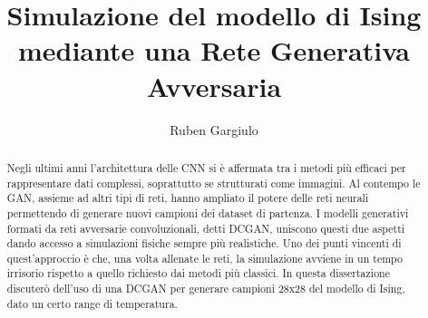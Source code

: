 \documentclass[Lau, noexaminfo, oneside]{sapthesis} %
\title{Simulazione del modello di Ising mediante una Rete Generativa Avversaria}
\author{Ruben Gargiulo}
\date{}
\begin{document}
\frontmatter
\maketitle

\begin{abstract}
Negli ultimi anni l'architettura delle CNN si è affermata tra i metodi più efficaci per rappresentare dati complessi, soprattutto se strutturati come immagini. Al contempo le GAN, assieme ad altri tipi di reti, hanno ampliato il potere delle reti neurali permettendo di generare nuovi campioni dei dataset di partenza.
I modelli generativi formati da reti avversarie convoluzionali, detti DCGAN, uniscono questi due aspetti dando accesso a simulazioni fisiche sempre più realistiche. Uno dei punti vincenti di quest'approccio è che, una volta allenate le reti, la simulazione avviene in un tempo irrisorio rispetto a quello richiesto dai metodi più classici. In questa dissertazione discuterò dell'uso di una DCGAN per generare campioni 28x28 del modello di Ising, dato un certo range di temperatura.
\end{abstract}
\tableofcontents
\mainmatter
\end{document}
